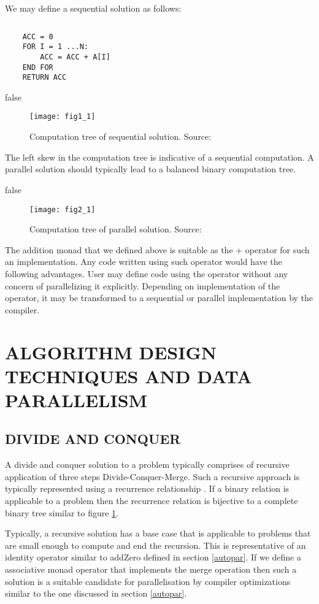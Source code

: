 \documentclass[12pt,a4paper]{article}
\begin{document}
We may define a sequential solution as follows:
    	\lstset{}
	\begin{lstlisting}
	\end{lstlisting}
    	\lstset{}
	\begin{lstlisting}
	ACC = 0
	FOR I = 1 ...N:
		ACC = ACC + A[I]
	END FOR
	RETURN ACC
	\end{lstlisting}

	\if false	
	\begin{figure}[h]
	\texttt{[image: fig1\_1]}
	\caption{Computation tree of sequential solution. Source: \cite{steele}}
		\centering
	\end{figure}
	\fi
	
	The left skew in the computation tree is indicative of a sequential computation.
A parallel solution should typically lead to a balanced binary computation tree.

	\if false	
	\begin{figure}[h]
	\texttt{[image: fig2\_1]}
	\caption{Computation tree of parallel solution. Source: \cite{steele}}
	\centering
	\label{fig:par}
	\end{figure}
	\fi
	
\par The addition monad that we defined above is suitable as the + operator for such an implementation. Any code written using such operator would have the following advantages. User may define code using the operator without any concern of parallelizing it explicitly. Depending on implementation of the operator, it may be transformed to a sequential or parallel implementation by the compiler.

	\section{\large ALGORITHM DESIGN TECHNIQUES AND DATA PARALLELISM}
	\subsection{DIVIDE AND CONQUER}
	\indent \par A divide and conquer solution to a problem typically comprises of recursive application of three steps Divide-Conquer-Merge. Such a recursive approach is typically represented using a recurrence relationship \cite{cormen}. If a binary relation is applicable to a problem then the recurrence relation is bijective to a complete binary tree similar to figure \ref{fig:par}.
	\par Typically, a recursive solution has a base case that is applicable to problems that are small enough to compute and end the recursion. This is representative of an identity operator similar to addZero defined in section \ref{autopar}. If we define a associative monad operator that implements the merge operation then such a solution is a suitable candidate for parallelisation by compiler optimizations similar to the one discussed in section \ref{autopar}.
\end{document}
